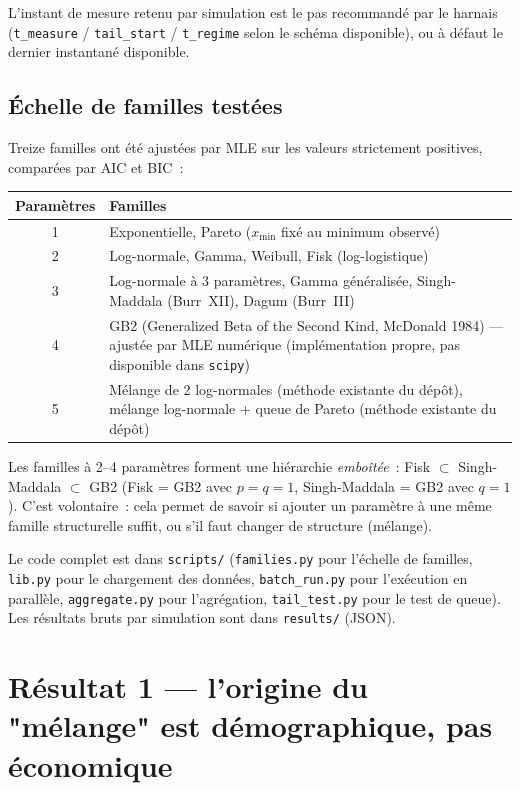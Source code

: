 \documentclass[11pt,a4paper]{article}
\begin{document}
L'instant de mesure retenu par simulation est le pas recommandé par le
harnais (\texttt{t\_measure} / \texttt{tail\_start} / \texttt{t\_regime}
selon le schéma disponible), ou à défaut le dernier instantané disponible.

\subsection{Échelle de familles testées}

Treize familles ont été ajustées par MLE sur les valeurs strictement
positives, comparées par AIC et BIC~:

\begin{center}
\begin{tabularx}{\linewidth}{cX}
\toprule
Paramètres & Familles \\
\midrule
1 & Exponentielle, Pareto ($x_{\min}$ fixé au minimum observé) \\
2 & Log-normale, Gamma, Weibull, Fisk (log-logistique) \\
3 & Log-normale à 3 paramètres, Gamma généralisée, Singh-Maddala
    (Burr~XII), Dagum (Burr~III) \\
4 & GB2 (Generalized Beta of the Second Kind, McDonald 1984) --- ajustée
    par MLE numérique (implémentation propre, pas disponible dans
    \texttt{scipy}) \\
5 & Mélange de 2 log-normales (méthode existante du dépôt), mélange
    log-normale + queue de Pareto (méthode existante du dépôt) \\
\bottomrule
\end{tabularx}
\end{center}

Les familles à 2--4 paramètres forment une hiérarchie \emph{emboîtée}~: Fisk
$\subset$ Singh-Maddala $\subset$ GB2 (Fisk = GB2 avec $p=q=1$,
Singh-Maddala = GB2 avec $q=1$). C'est volontaire~: cela permet de savoir
si ajouter un paramètre à une même famille structurelle suffit, ou s'il
faut changer de structure (mélange).

Le code complet est dans \texttt{scripts/} (\texttt{families.py} pour
l'échelle de familles, \texttt{lib.py} pour le chargement des données,
\texttt{batch\_run.py} pour l'exécution en parallèle, \texttt{aggregate.py}
pour l'agrégation, \texttt{tail\_test.py} pour le test de queue). Les
résultats bruts par simulation sont dans \texttt{results/} (JSON).

\section{Résultat 1 --- l'origine du "mélange" est démographique, pas
économique}
\label{sec:cohortes}
\end{document}
